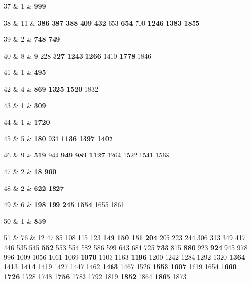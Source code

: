 37 & 1 & \textbf{999} \\  

38 & 11 & \textbf{386} \textbf{387} \textbf{388} \textbf{409} \textbf{432} 653 \textbf{654} 700 \textbf{1246} \textbf{1383} \textbf{1855} \\  

39 & 2 & \textbf{748} \textbf{749} \\  

40 & 8 & \textbf{9} 228 \textbf{327} \textbf{1243} \textbf{1266} 1410 \textbf{1778} 1846 \\  

41 & 1 & \textbf{495} \\  

42 & 4 & \textbf{869} \textbf{1325} \textbf{1520} 1832 \\  

43 & 1 & \textbf{309} \\  

44 & 1 & \textbf{1720} \\  

45 & 5 & \textbf{180} 934 \textbf{1136} \textbf{1397} \textbf{1407} \\  

46 & 9 & \textbf{519} 944 \textbf{949} \textbf{989} \textbf{1127} 1264 1522 1541 1568 \\  

47 & 2 & \textbf{18} \textbf{960} \\  

48 & 2 & \textbf{622} \textbf{1827} \\  

49 & 6 & \textbf{198} \textbf{199} \textbf{245} \textbf{1554} 1655 1861 \\  

50 & 1 & \textbf{859} \\  

51 & 76 & 12 47 85 108 115 123 \textbf{149} \textbf{150} \textbf{151} \textbf{204} 205 223 244 306 313 349 417 446 535 545 \textbf{552} 553 554 582 586 599 643 684 725 \textbf{733} 815 \textbf{880} 923 \textbf{924} 945 978 996 1009 1056 1061 1069 \textbf{1070} 1103 1163 \textbf{1196} 1200 1242 1284 1292 1320 \textbf{1364} 1413 \textbf{1414} 1419 1427 1447 1462 \textbf{1463} 1467 1526 \textbf{1553} \textbf{1607} 1619 1654 \textbf{1660} \textbf{1726} 1728 1748 \textbf{1756} 1783 1792 1819 \textbf{1852} 1864 \textbf{1865} 1873 \\  

